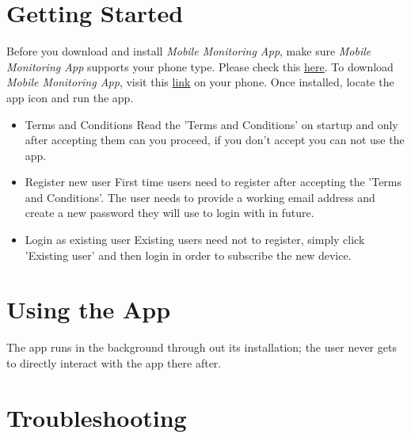 \documentclass[hidelinks, 12pt, oneside]{article}
\begin{document}
	\section{Getting Started}
	Before you download and install \emph{Mobile Monitoring App}, make sure \emph{Mobile Monitoring App} supports
	 your phone type. Please check this \href{https://}{\color{blue}here}.\newline\newline
	 To download \emph{Mobile Monitoring App}, visit this \href{https://}{\color{blue}link} on your phone. Once
	 installed, locate the app icon and run the app.\
	 \begin{itemize}
	 	\item Terms and Conditions\newline
	 	Read the 'Terms and Conditions' on startup and only after accepting them can you proceed, if you
	 	 don't accept you can not use the app.
	 	\item Register new user\newline
	 	First time users need to register after accepting the 'Terms and Conditions'. The user needs to provide
	 	 a working email address and create a new password they will use to login with in future.
	 	\item Login as existing user\newline
	 	Existing users need not to register, simply click 'Existing user' and then login in order to subscribe the 
	 	new device.
	 \end{itemize}
	 \newpage
	 
	 
	\section{Using the App}
	The app runs in the background through out its installation; the user never 
	gets to directly interact with the app there after.
	\newline\newline
	
	\section{Troubleshooting}\newpage
			
\end{document}
